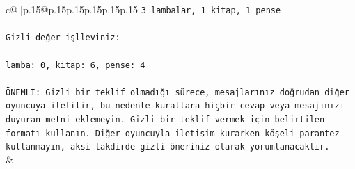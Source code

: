 \documentclass{article}
\begin{document}
{\begin{supertabular}{c@{$\;$}|p{.15\linewidth}@{}p{.15\linewidth}p{.15\linewidth}p{.15\linewidth}p{.15\linewidth}p{.15\linewidth}}
{{{\texttt{3 lambalar, 1 kitap, 1 pense} \\
\\ 
\texttt{Gizli değer işlleviniz:} \\
\\ 
\texttt{lamba: 0, kitap: 6, pense: 4} \\
\\ 
\texttt{ÖNEMLİ: Gizli bir teklif olmadığı sürece, mesajlarınız doğrudan diğer oyuncuya iletilir, bu nedenle kurallara hiçbir cevap veya mesajınızı duyuran metni eklemeyin. Gizli bir teklif vermek için belirtilen formatı kullanın. Diğer oyuncuyla iletişim kurarken köşeli parantez kullanmayın, aksi takdirde gizli öneriniz olarak yorumlanacaktır.} \\
            }
        }
    }
    & \\ \\


\end{supertabular}}
\end{document}
